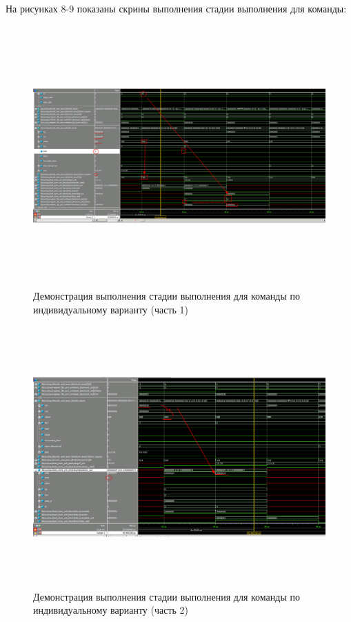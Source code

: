 На рисунках 8-9 показаны скрины выполнения стадии выполнения для команды:
\FloatBarrier
\begin{figure}[h]
	\begin{center}
		\includegraphics[width=\linewidth, height=10cm]{inc/third_my.png}
	\end{center}
	\caption{Демонстрация выполнения стадии выполнения для команды по индивидуальному варианту (часть 1)}
\end{figure}
\FloatBarrier

\FloatBarrier
\begin{figure}[h]
	\begin{center}
		\includegraphics[width=\linewidth, height=10cm]{inc/third_1_my.png}
	\end{center}
	\caption{Демонстрация выполнения стадии выполнения для команды по индивидуальному варианту (часть 2)}
\end{figure}
\FloatBarrier

